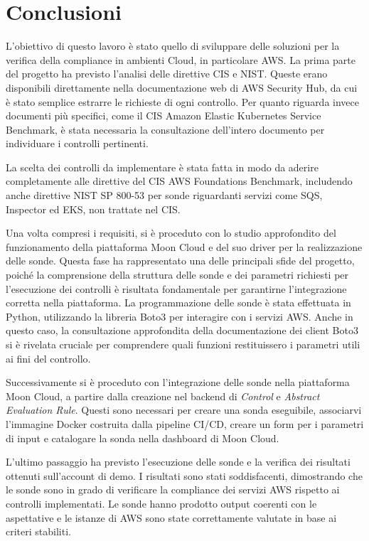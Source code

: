 \chapter{Conclusioni}
\label{cap:conclusioni}

L'obiettivo di questo lavoro è stato quello di sviluppare delle soluzioni per la verifica della compliance in ambienti Cloud, in particolare AWS. La prima parte del progetto ha previsto l'analisi delle direttive CIS e NIST. Queste erano disponibili direttamente nella documentazione web di AWS Security Hub, da cui è stato semplice estrarre le richieste di ogni controllo. Per quanto riguarda invece documenti più specifici, come il CIS Amazon Elastic Kubernetes Service Benchmark, è stata necessaria la consultazione dell'intero documento per individuare i controlli pertinenti.

La scelta dei controlli da implementare è stata fatta in modo da aderire completamente alle direttive del CIS AWS Foundations Benchmark, includendo anche direttive NIST SP 800-53 per sonde riguardanti servizi come SQS, Inspector ed EKS, non trattate nel CIS.

Una volta compresi i requisiti, si è proceduto con lo studio approfondito del funzionamento della piattaforma Moon Cloud e del suo driver per la realizzazione delle sonde. Questa fase ha rappresentato una delle principali sfide del progetto, poiché la comprensione della struttura delle sonde e dei parametri richiesti per l'esecuzione dei controlli è risultata fondamentale per garantirne l'integrazione corretta nella piattaforma. La programmazione delle sonde è stata effettuata in Python, utilizzando la libreria Boto3 per interagire con i servizi AWS. Anche in questo caso, la consultazione approfondita della documentazione dei client Boto3 si è rivelata cruciale per comprendere quali funzioni restituissero i parametri utili ai fini del controllo.

Successivamente si è proceduto con l'integrazione delle sonde nella piattaforma Moon Cloud, a partire dalla creazione nel backend di \emph{Control} e \emph{Abstract Evaluation Rule}. Questi sono necessari per creare una sonda eseguibile, associarvi l'immagine Docker costruita dalla pipeline CI/CD, creare un form per i parametri di input e catalogare la sonda nella dashboard di Moon Cloud. 

L'ultimo passaggio ha previsto l'esecuzione delle sonde e la verifica dei risultati ottenuti sull'account di demo. I risultati sono stati soddisfacenti, dimostrando che le sonde sono in grado di verificare la compliance dei servizi AWS rispetto ai controlli implementati. Le sonde hanno prodotto output coerenti con le aspettative e le istanze di AWS sono state correttamente valutate in base ai criteri stabiliti.


